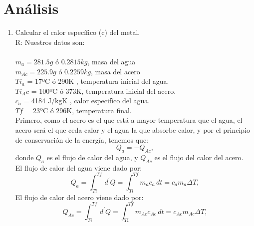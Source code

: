 \documentclass[a4paper, 12p]{article}
\begin{document}
\section{Análisis}
\begin{enumerate}
      \item Calcular el calor específico (c) del metal.\\
      R: Nuestros datos son:\\ \\
                     $m_{a} = 281.5 g$ ó $0.2815 kg$, masa del agua \\
                     $m_{Ac} = 225.9 g$ ó $0.2259 kg$, masa del acero\\
                     $Ti_a$ = 17ºC ó 290K , temperatura inicial del agua. \\
                     $Ti_Ac$ = 100ºC ó 373K, temperatura inicial del acero. \\ 
                     $c_{a}$ = 4184 J/kgK , calor especifíco del agua. \cite{agua}\\
                     $Tf$ = 23ºC ó 296K, temperatura final.\\ 
                     
                     Primero, como el acero es el que está a mayor temperatura que el agua, el acero será el que ceda calor y el agua la que absorbe calor, y por el principio de conservación de la energía, tenemos que:\\
                     \begin{equation}\label{eq1}
                     Q_{a} = -Q_{Ac},
                     \end{equation}
                     donde $ Q_{a}$ es el flujo de calor del agua, y $Q_{Ac}$ es el flujo del calor del acero.\\ 
                     
                     El flujo de calor del agua viene dado por:
                     \begin{equation}\label{eq2}
                     Q_{a} = \int_{Ti}^{Tf} \! \, d^{\prime}Q  = \int_{Ti}^{Tf} \! m_{a}c_{a} \, dt = c_{a} m_{a} \Delta T,
                     \end{equation}
                     El flujo de calor del acero viene dado por:
                     \begin{equation}\label{eq3}		       
                     Q_{Ac} = \int_{Ti}^{Tf} \! \, d^{\prime}Q  = \int_{Ti}^{Tf} \! m_{Ac}c_{Ac} \, dt = c_{Ac} m_{Ac} \Delta T,
                     \end{equation}
                    

\end{enumerate}
\end{document}
